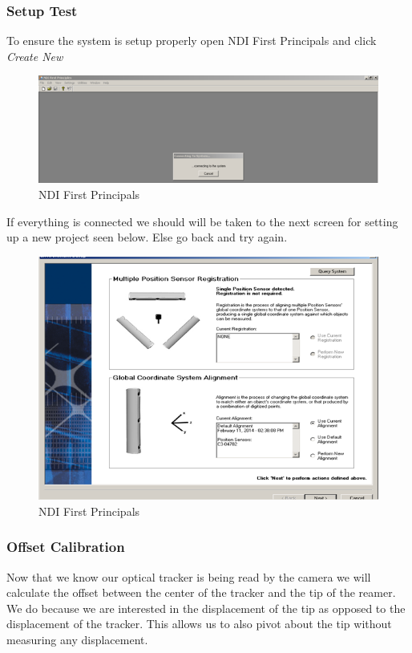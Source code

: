 \documentclass[pdftex,11pt,letterpaper]{article}
\begin{document}
\subsubsection{Setup Test}
To ensure the system is setup properly open NDI First Principals and click \textit{Create New} \\

\begin{figure}[ht!]
\centering
\includegraphics[width=150mm]{./images/ot}
\caption{NDI First Principals}
\end{figure}

If everything is connected we should will be taken to the next screen for setting up a new project seen below. Else go back and try again. \\

\begin{figure}[ht!]
\centering
\includegraphics[width=150mm]{./images/ot_2}
\caption{NDI First Principals}
\end{figure}

\subsubsection{Offset Calibration}
Now that we know our optical tracker is being read by the camera we will calculate the offset between the center of the tracker and the tip of the reamer. We do because we are interested in the displacement of the tip as opposed to the displacement of the tracker. This allows us to also pivot about the tip without measuring any displacement. \\
\end{document}
